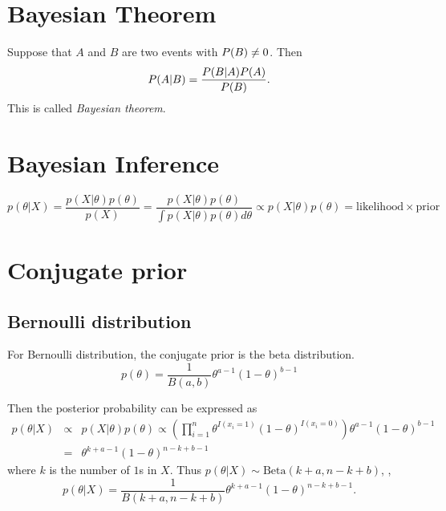 \section{Bayesian Theorem}

Suppose that $A$ and $B$ are two events with $P(B) \neq 0$. Then
\begin{equation}
\label{eq:bayes-theorem}
P(A|B) = \frac{P(B|A) P(A)}{P(B)}.
\end{equation}
This is called \emph{Bayesian theorem}.

\section{Bayesian Inference}

\begin{equation}
p(\theta|X)
= \frac{p(X|\theta) p(\theta)}{ p(X)}
= \frac{p(X|\theta) p(\theta)}{ \int p(X|\theta) p(\theta) d \theta }
\propto
p(X|\theta) p(\theta)
=
\mathrm{likelihood} \times \mathrm{prior}
\end{equation}


\section{Conjugate prior}

\subsection{Bernoulli distribution}

For Bernoulli distribution,
the conjugate prior is the beta distribution.
\begin{equation}
p(\theta) = \frac{1}{B(a,b)} \theta^{a-1} (1-\theta)^{b-1}
\end{equation}

Then the posterior probability can be expressed as
\begin{eqnarray*}
p(\theta|X)
&\propto& p(X|\theta) p(\theta)
\propto \left(\prod_{i=1}^n \theta^{I(x_i=1)} (1-\theta)^{I(x_i=0)} \right) \theta^{a-1} (1-\theta)^{b-1}
\\
&=&
\theta^{k+a-1}(1-\theta)^{n-k+b-1}
\end{eqnarray*}
where $k$ is the number of $1$s in $X$.
Thus $p(\theta|X) \sim \mathrm{Beta}(k+a, n-k+b)$, \ie,
\begin{equation}
p(\theta|X) = \frac{1}{B(k+a,n-k+b)} \theta^{k+a-1}(1-\theta)^{n-k+b-1}.
\end{equation}






